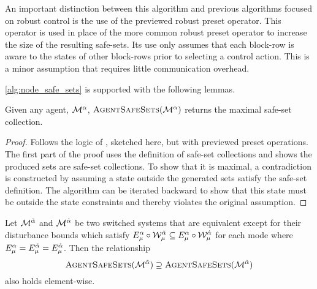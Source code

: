 \begin{remark}
An important distinction between this algorithm and previous algorithms focused on robust control is the use of the previewed robust preset operator. This operator is used in place of the more common robust preset operator to increase the size of the resulting safe-sets. Its use only assumes that each block-row is aware to the states of other block-rows prior to selecting a control action. This is a minor assumption that requires little communication overhead.
\end{remark}
\autoref{alg:node_safe_sets} is supported with the following lemmas. 
\begin{lemma}\label{lemma:maximal_proof}
Given any agent, $\mathcal{M}^{\alpha}$, $\Call{AgentSafeSets}{\agent{\agentidx}}$ returns the maximal safe-set collection.
\end{lemma}
\begin{proof}
Follows the logic of \cite[Theorem 2]{Danielson2019}, sketched here, but with previewed preset operations. The first part of the proof uses the definition of safe-set collections and shows the produced sets are safe-set collections. To show that it is maximal, a contradiction is constructed by assuming a state outside the generated sets satisfy the safe-set definition. The algorithm can be iterated backward to show that this state must be outside the state constraints and thereby violates the original assumption.
\end{proof}
\begin{lemma}
Let $\mathcal{M}^{\tilde{\alpha}}$ and $\mathcal{M}^{\hat{\alpha}}$ be two switched systems that are equivalent except for their disturbance bounds which satisfy $E_{{\mu}}^{\alpha}\circ\mathcal{W}^{\tilde{\alpha}}_{\mu}\subseteq E_{{\mu}}^{\alpha}\circ\mathcal{W}^{\hat{\alpha}}_{\mu}$ for each mode where $E_{{\mu}}^{\alpha}=E_{{\mu}}^{\tilde{\alpha}}=E_{{\mu}}^{\hat{\alpha}}$. Then the relationship
$$\Call{AgentSafeSets}{\agent{\tilde\agentidx}}\supseteq\Call{AgentSafeSets}{\agent{\hat\agentidx}}$$
also holds element-wise. 
\end{lemma}
